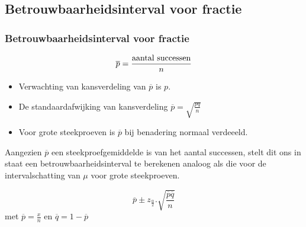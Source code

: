 \documentclass{beamer}
\begin{document}
\subsection{Betrouwbaarheidsinterval voor fractie}
\begin{frame}
  \frametitle{Betrouwbaarheidsinterval voor fractie}
  \[ \overline{p} = \frac{\textnormal{aantal successen}}{n} \]
  \begin{itemize}
  \item Verwachting van kansverdeling van $\overline{p}$ is $p$.
  \item De standaardafwijking van kansverdeling $\overline{p} = \sqrt{\frac{pq}{n}}$
  \item Voor grote steekproeven is $\overline{p}$ bij benadering normaal verdeeeld.
\end{itemize}
Aangezien $\overline{p}$ een steekproefgemiddelde is van het aantal successen, stelt dit ons in staat een betrouwbaarheidsinterval te berekenen analoog als die voor de intervalschatting van $\mu$ voor grote steekproeven.


  \[ \overline{p} \pm z_{\frac{\alpha}{2}}.\sqrt{\frac{\overline{p}\overline{q}}{n}} \]
  met $\overline{p} = \frac{x}{n}$ en $\overline{q} = 1- \overline{p}$

\end{frame}
\end{document}
